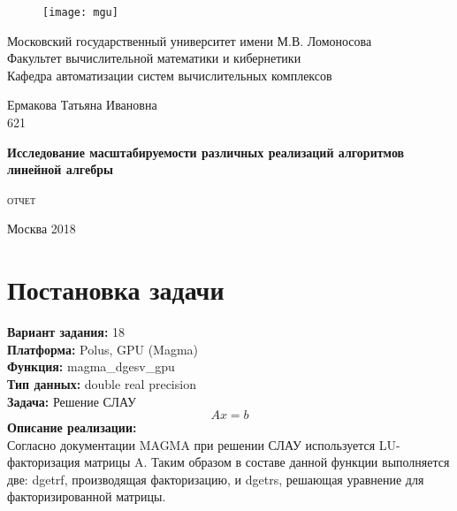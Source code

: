 \documentclass[12pt]{article}
\begin{document}
\sloppy

	\begin{titlepage}
		\newpage
		
		\begin{figure}[t]
			\centering
			\texttt{[image: mgu]}
		\end{figure}
		
		\begin{center}
			Московский государственный университет имени М.В. Ломоносова \\
			Факультет вычислительной математики и кибернетики \\
			Кафедра автоматизации систем вычислительных комплексов \\
		\end{center}
		
		\vspace{6em}
		
		\begin{center}
			\large
			Ермакова Татьяна Ивановна \\
			621
		\end{center}
		
		\begin{center}
			\Large
			\bfseries
			Исследование масштабируемости различных реализаций алгоритмов линейной алгебры
		\end{center}
		
		\vspace{0.3em}
		
		\begin{center}
			\large
			\textsc{
				отчет
			}
		\end{center}
		
		\vspace{\fill}
		
		\begin{center}
			Москва 2018
		\end{center}
		
	\end{titlepage}


	\section{Постановка задачи}
	\textbf{Вариант задания:} 18 \\
	\textbf{Платформа:} Polus, GPU (Magma) \\
	\textbf{Функция:} magma\_dgesv\_gpu \\
	\textbf{Тип данных:} double real precision \\
	\textbf{Задача:} Решение СЛАУ \\
	\begin{equation*}
	Ax=b
	\end{equation*}
	\textbf{Описание реализации:} \\
	Согласно документации MAGMA при решении СЛАУ используется LU-факторизация матрицы A. Таким образом в составе данной функции выполняется две: dgetrf, производящая факторизацию, и dgetrs, решающая уравнение для факторизированной матрицы.
	
\end{document}
